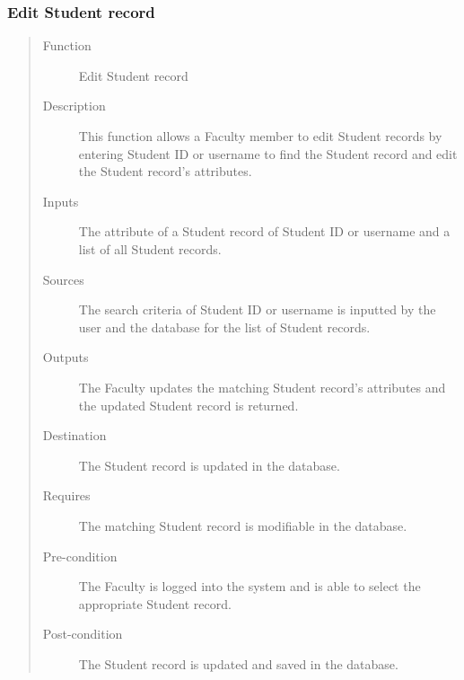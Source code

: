 \subsubsection{Edit Student record} 
\begin{quote} %
\begin{description}
\item[Function]
   Edit Student record
\item[Description]
   This function allows a Faculty member to edit Student records by entering
   Student ID or username to find the Student record and edit the Student
   record's attributes.
\item[Inputs]
   The attribute of a Student record of Student ID or username and a list of all
   Student records.
\item[Sources]
   The search criteria of Student ID or username is inputted by the user and the
   database for the list of Student records.
\item[Outputs]
   The Faculty updates the matching Student record's attributes and the updated
   Student record is returned.
\item[Destination]
   The Student record is updated in the database.
\item[Requires]
   The matching Student record is modifiable in the database.
\item[Pre-condition]
   The Faculty is logged into the system and is able to select the appropriate
   Student record.
\item[Post-condition]
   The Student record is updated and saved in the database.
\end{description}
\end{quote} %

